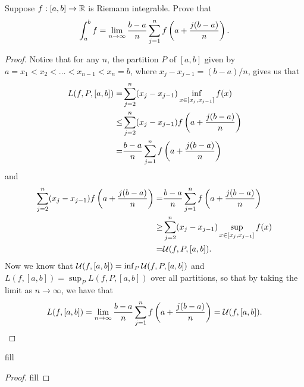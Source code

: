 \begin{exercise}{8}
Suppose $f:[a,b]\to\mathbb{R}$ is Riemann integrable.
Prove that 
\begin{align*}
    \int_a^b f = \lim_{n\to\infty} \frac{b-a}{n}\sum_{j=1}^n f\left( a+\frac{j(b-a)}{n}\right).
\end{align*}
\end{exercise}
\begin{proof}
Notice that for any $n$, the partition $P$ of $[a,b]$ given by $a=x_1<x_2<\dots<x_{n-1}<x_n=b$, where $x_j-x_{j-1} = (b-a)/n$, gives us that
\begin{align*}
    L(f, P, [a,b]) 
    =& \sum_{j=2}^n (x_j-x_{j-1}) \inf_{x\in[x_j,x_{j-1}]}f(x)\\
    \leq& \sum_{j=2}^n (x_j-x_{j-1}) f\left( a+\frac{j(b-a)}{n}\right)\\
    =& \frac{b-a}{n}\sum_{j=1}^n f\left( a+\frac{j(b-a)}{n}\right) 
\end{align*}
and
\begin{align*}
    \sum_{j=2}^n (x_j-x_{j-1}) f\left( a+\frac{j(b-a)}{n}\right)
    =& \frac{b-a}{n}\sum_{j=1}^n f\left( a+\frac{j(b-a)}{n}\right)\\
    \geq& \sum_{j=2}^n (x_j-x_{j-1}) \sup_{x\in[x_j,x_{j-1}]}f(x)\\
    =& \mathcal{U}(f,P,[a,b]).
\end{align*}
Now we know that $\mathcal{U}(f,[a,b]) = \inf_P \mathcal{U}(f,P,[a,b])$ and $L(f,[a,b]) = \sup_P L(f,P,[a,b])$ over all partitions, so that by taking the limit as $n\to \infty$, we have that 
\begin{align*}
    L(f, [a,b]) = \lim_{n\to\infty} \frac{b-a}{n}\sum_{j=1}^n f\left( a+\frac{j(b-a)}{n}\right) = \mathcal{U}(f,[a,b]).
\end{align*}
\end{proof} 

\begin{exercise}{13}
fill
\end{exercise}
\begin{proof}
fill
\end{proof} 


